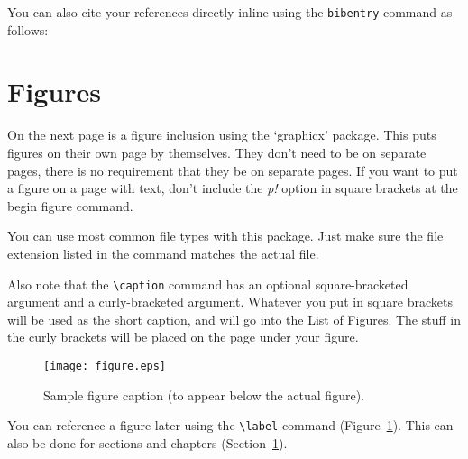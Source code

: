 \documentclass[12pt]{report} %
\begin{document}
You can also cite your references directly inline using the \texttt{bibentry} command as follows: 


\section{Figures} \label{section:figures}
On the next page is a figure inclusion using the `graphicx' package. This puts figures on their own page by 
themselves. They don't need to be on separate pages, there is no requirement that they be on separate pages.
If you want to put a figure on a page with text, don't include the \emph{p!} option in square brackets at 
the begin figure command.

You can use most common file types with this package. Just make sure the file extension listed in the command
matches the actual file.

Also note that the \verb=\caption= command has an optional square-bracketed argument and a curly-bracketed 
argument.  Whatever you put in square brackets will be used as the short caption, and will go into the 
List of Figures.  The stuff in the curly brackets will be placed on the page under your figure.


\begin{figure}[p!]
\begin{center}
\texttt{[image: figure.eps]}
\caption[Short figure caption for LOF]{Sample figure caption (to appear below
the actual figure). \label{samplefig}}
\end{center}
\end{figure}

You can reference a figure later using the \verb=\label= command (Figure~\ref{samplefig}). This can also be
done for sections and chapters (Section~\ref{section:figures}).











\appendix
\end{document}
